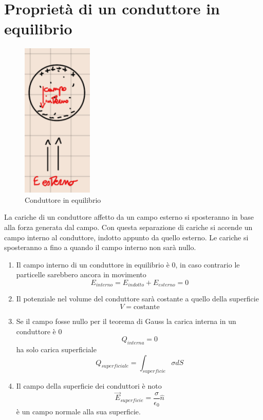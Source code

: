 \documentclass[a4paper, 12pt]{book}
\theoremstyle{plain}
\begin{document}
\section{Proprietà di un conduttore in equilibrio}
\begin{figure}
    \includegraphics[width=0.3\textwidth]{conduttore.png}
    \caption{Conduttore in equilibrio}
\end{figure}

La  cariche di un conduttore affetto da un campo esterno si 
sposteranno in base alla forza generata dal campo. Con questa separazione
di cariche si accende un campo interno al conduttore, indotto appunto da quello esterno.
Le cariche si sposteranno a fino a quando il campo interno non sarà nullo.

\begin{enumerate}
    \item Il campo interno di un conduttore in equilibrio è $0$, in caso contrario le particelle sarebbero ancora in movimento\[{E_{interno}} = {E_{indotto}} + {E_{esterno}} = 0\]
    \item Il potenziale nel volume del conduttore sarà costante a quello della superficie \[V = \textrm{costante}\]
    \item Se il campo fosse nullo per il teorema di Gauss la carica interna in un conduttore è $0$ \[Q_{interna} = 0\]ha solo carica superficiale \[Q_{superficiale} = \int_{superficie} \sigma dS\]
    \item Il campo della superficie dei conduttori è noto \[\vec{E}_{superficie} = \frac{\sigma}{\epsilon_0}\hat{n}\] è un campo normale alla sua superficie.
\end{enumerate}
\end{document}
